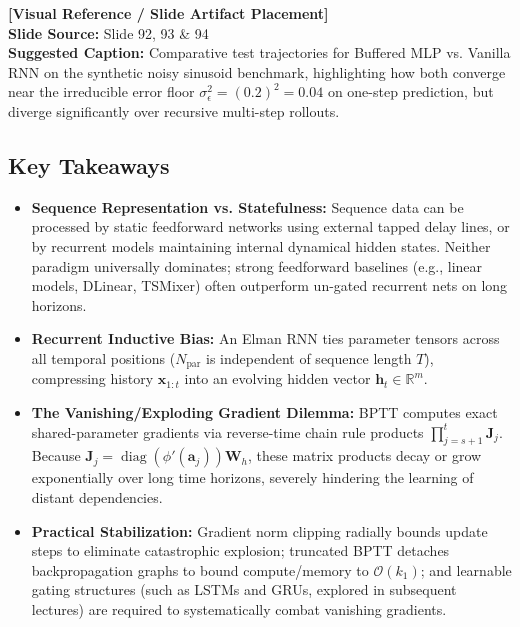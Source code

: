 \documentclass[11pt,a4paper]{article}
\theoremstyle{definition}
\theoremstyle{plain}
\newcommand{\slideimageplaceholder}[2]{
    \begin{center}
    \begin{tcolorbox}[
        enhanced,
        colback=gray!8!white,
        colframe=gray!60!black,
        width=0.92\textwidth,
        arc=2mm,
        frame hidden,
        borderline={0.5mm}{0mm}{gray!60!black, dashed},
        halign=center
    ]
        \vspace{0.4cm}
        \textbf{\textsf{[Visual Reference / Slide Artifact Placement]}} \\
        \vspace{0.2cm}
        \textsf{\textbf{Slide Source:} Slide #1} \\
        \textsf{\textbf{Suggested Caption:} #2}
        \vspace{0.4cm}
    \end{tcolorbox}
    \end{center}
}
\begin{document}
\slideimageplaceholder{92, 93 \& 94}{Comparative test trajectories for Buffered MLP vs. Vanilla RNN on the synthetic noisy sinusoid benchmark, highlighting how both converge near the irreducible error floor $\sigma_\epsilon^2 = (0.2)^2 = 0.04$ on one-step prediction, but diverge significantly over recursive multi-step rollouts.}

\subsection{Key Takeaways}
\begin{itemize}
    \item \textbf{Sequence Representation vs. Statefulness:} Sequence data can be processed by static feedforward networks using external tapped delay lines, or by recurrent models maintaining internal dynamical hidden states. Neither paradigm universally dominates; strong feedforward baselines (e.g., linear models, DLinear, TSMixer) often outperform un-gated recurrent nets on long horizons.
    \item \textbf{Recurrent Inductive Bias:} An Elman RNN ties parameter tensors across all temporal positions ($N_{\text{par}}$ is independent of sequence length $T$), compressing history $\mathbf{x}_{1:t}$ into an evolving hidden vector $\mathbf{h}_t \in \mathbb{R}^m$.
    \item \textbf{The Vanishing/Exploding Gradient Dilemma:} BPTT computes exact shared-parameter gradients via reverse-time chain rule products $\prod_{j=s+1}^t \mathbf{J}_j$. Because $\mathbf{J}_j = \operatorname{diag}(\phi'(\mathbf{a}_j))\mathbf{W}_h$, these matrix products decay or grow exponentially over long time horizons, severely hindering the learning of distant dependencies.
    \item \textbf{Practical Stabilization:} Gradient norm clipping radially bounds update steps to eliminate catastrophic explosion; truncated BPTT detaches backpropagation graphs to bound compute/memory to $\mathcal{O}(k_1)$; and learnable gating structures (such as LSTMs and GRUs, explored in subsequent lectures) are required to systematically combat vanishing gradients.
\end{itemize}
\end{document}
